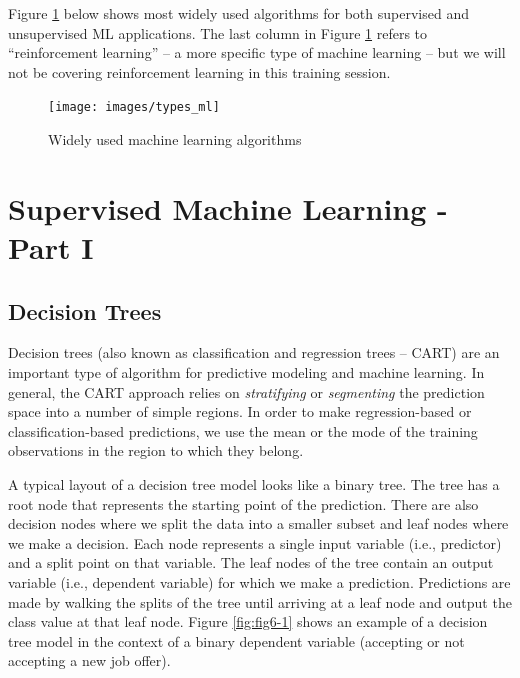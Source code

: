 \documentclass[]{book}
\begin{document}
Figure \ref{fig:fig5-7} below shows most widely used algorithms for both supervised and unsupervised ML applications. The last column in Figure \ref{fig:fig5-7} refers to ``reinforcement learning'' -- a more specific type of machine learning -- but we will not be covering reinforcement learning in this training session.

\begin{figure}
\texttt{[image: images/types\_ml]} \caption{Widely used machine learning algorithms}\label{fig:fig5-7}
\end{figure}

\hypertarget{supervised-machine-learning---part-i}{%
\chapter{Supervised Machine Learning - Part I}\label{supervised-machine-learning---part-i}}

\hypertarget{decision-trees}{%
\section{Decision Trees}\label{decision-trees}}

Decision trees (also known as classification and regression trees -- CART) are an important type of algorithm for predictive modeling and machine learning. In general, the CART approach relies on \emph{stratifying} or \emph{segmenting} the prediction space into a number of simple regions. In order to make regression-based or classification-based predictions, we use the mean or the mode of the training observations in the region to which they belong.

A typical layout of a decision tree model looks like a binary tree. The tree has a root node that represents the starting point of the prediction. There are also decision nodes where we split the data into a smaller subset and leaf nodes where we make a decision. Each node represents a single input variable (i.e., predictor) and a split point on that variable. The leaf nodes of the tree contain an output variable (i.e., dependent variable) for which we make a prediction. Predictions are made by walking the splits of the tree until arriving at a leaf node and output the class value at that leaf node. Figure \ref{fig:fig6-1} shows an example of a decision tree model in the context of a binary dependent variable (accepting or not accepting a new job offer).
\end{document}
